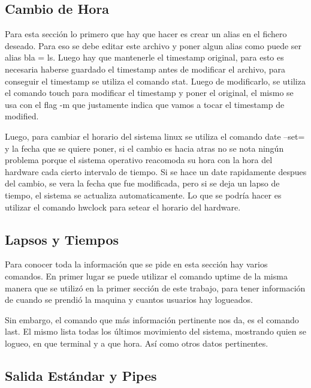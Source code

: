 \documentclass[a4paper, 12pt]{article}
\begin{document}
\subsection*{Cambio de Hora}

Para esta secci\'on lo primero que hay que hacer es crear un alias en el fichero deseado. Para eso se debe editar este archivo y poner algun alias como puede ser alias bla = ls. Luego hay que mantenerle el timestamp original, para esto es necesaria haberse guardado el timestamp antes de modificar el archivo, para conseguir el timestamp se utiliza el comando stat. Luego de modificarlo, se utiliza el comando touch para modificar el timestamp y poner el original, el mismo se usa con el flag -m que justamente indica que vamos a tocar el timestamp de modified. 

Luego, para cambiar el horario del sistema linux se utiliza el comando date --set= y la fecha que se quiere poner, si el cambio es hacia atras no se nota ning\'un problema porque el sistema operativo reacomoda su hora con la hora del hardware cada cierto intervalo de tiempo. Si se hace un date rapidamente despues del cambio, se vera la fecha que fue modificada, pero si se deja un lapso de tiempo, el sistema se actualiza automaticamente. Lo que se podr\'ia hacer es utilizar el comando hwclock para setear el horario del hardware.

\subsection*{Lapsos y Tiempos}

Para conocer toda la informaci\'on que se pide en esta secci\'on hay varios comandos. En primer lugar se puede utilizar el comando uptime de la misma manera que se utiliz\'o en la primer secci\'on de este trabajo, para tener informaci\'on de cuando se prendi\'o la maquina y cuantos usuarios hay logueados. 

Sin embargo, el comando que m\'as informaci\'on pertinente nos da, es el comando last. El mismo lista todas los \'ultimos movimiento del sistema, mostrando quien se logueo, en que terminal y a que hora. As\'i como otros datos pertinentes.

\subsection*{Salida Est\'andar y Pipes}
\end{document}
